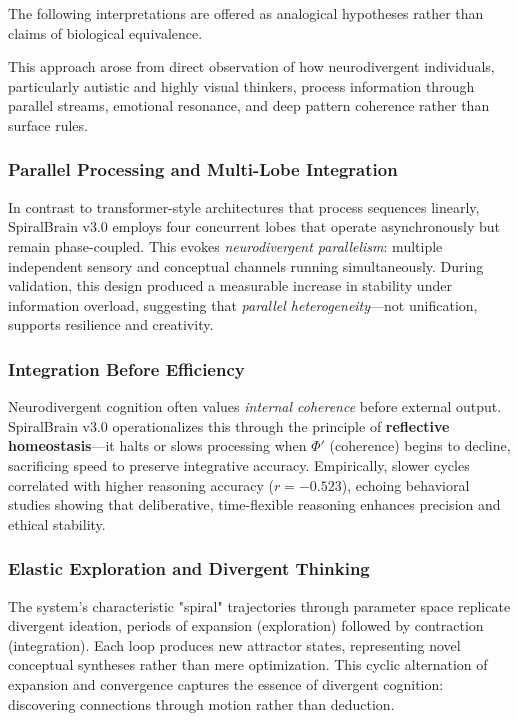 \documentclass[11pt,a4paper]{article}
\begin{document}
The following interpretations are offered as analogical hypotheses rather than claims of biological equivalence.

This approach arose from direct observation of how neurodivergent individuals, particularly autistic and highly visual thinkers, process information through parallel streams, emotional resonance, and deep pattern coherence rather than surface rules.

\subsubsection{Parallel Processing and Multi-Lobe Integration}

In contrast to transformer-style architectures that process sequences linearly, SpiralBrain v3.0 employs four concurrent lobes that operate asynchronously but remain phase-coupled.
This evokes \textit{neurodivergent parallelism}: multiple independent sensory and conceptual channels running simultaneously.
During validation, this design produced a measurable increase in stability under information overload, suggesting that \textit{parallel heterogeneity}---not unification, supports resilience and creativity.

\subsubsection{Integration Before Efficiency}

Neurodivergent cognition often values \textit{internal coherence} before external output.
SpiralBrain v3.0 operationalizes this through the principle of \textbf{reflective homeostasis}---it halts or slows processing when $\Phi'$ (coherence) begins to decline, sacrificing speed to preserve integrative accuracy.
Empirically, slower cycles correlated with higher reasoning accuracy ($r = -0.523$), echoing behavioral studies showing that deliberative, time-flexible reasoning enhances precision and ethical stability.

\subsubsection{Elastic Exploration and Divergent Thinking}

The system's characteristic "spiral" trajectories through parameter space replicate divergent ideation, periods of expansion (exploration) followed by contraction (integration).
Each loop produces new attractor states, representing novel conceptual syntheses rather than mere optimization.
This cyclic alternation of expansion and convergence captures the essence of divergent cognition: discovering connections through motion rather than deduction.
\end{document}
